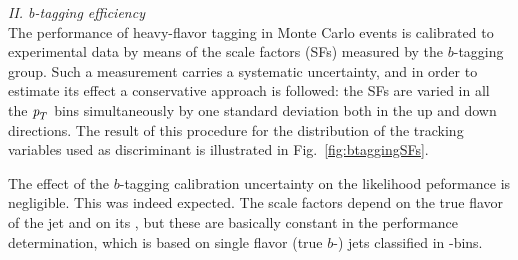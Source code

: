 
\vspace{3mm}
{\em II. b-tagging efficiency} %
\\[3mm]
The performance of heavy-flavor tagging in Monte Carlo events is calibrated to experimental data by means of the scale factors (SFs) measured by the $b$-tagging group. %
Such a measurement carries a systematic uncertainty, and in order to estimate its effect a conservative approach is followed: %
the SFs are varied in all the ${\emph{p}_{T}}$ bins simultaneously by one standard deviation both in the up and down directions. The result of this procedure for the distribution of the tracking variables used as discriminant is illustrated in Fig.~\ref{fig:btaggingSFs}. 

The effect of the $b$-tagging calibration uncertainty on the likelihood peformance is negligible.
This was indeed expected. The scale factors depend on the true flavor of the jet and on its \pt, but these are basically constant in the performance determination, which is based on single flavor (true $b$-) jets classified in \pt-bins.

